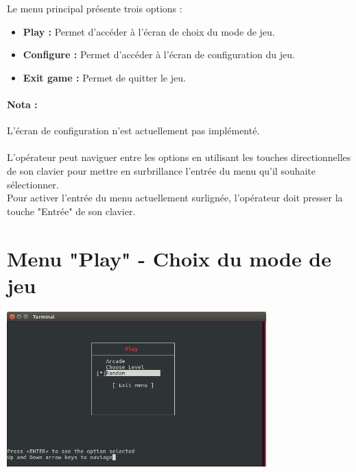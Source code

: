 Le menu principal présente trois options :
\begin{itemize}
	\item \textbf{Play :} Permet d'accéder à l'écran de choix du mode de jeu.
	\item \textbf{Configure :} Permet d'accéder à l'écran de configuration du jeu.
	\item \textbf{Exit game :} Permet de quitter le jeu.
\end{itemize}

\paragraph{Nota :} L'écran de configuration n'est actuellement pas implémenté.

\paragraph{} L'opérateur peut naviguer entre les options en utilisant les touches directionnelles de son clavier pour mettre en surbrillance l'entrée du menu qu'il souhaite sélectionner. \\
Pour activer l'entrée du menu actuellement surlignée, l'opérateur doit presser la touche "Entrée" de son clavier.


\section{Menu "Play" - Choix du mode de jeu}

\begin{center}
	\includegraphics[width=0.75\textwidth]{annexe-manuel_utilisateur/rsrc/Menu_Play-random.png}
\end{center}

